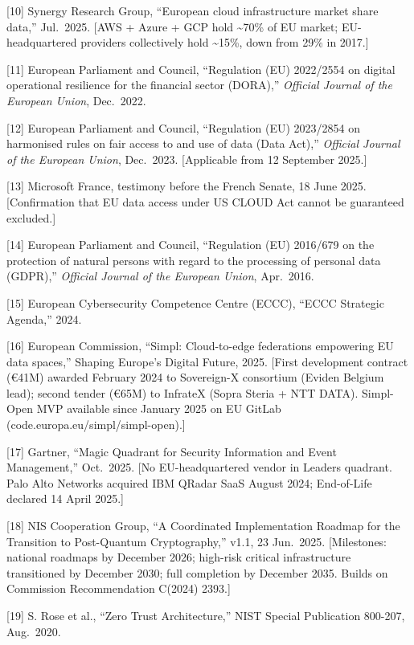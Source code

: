 \documentclass{ieeeaccess}
\begin{document}
{[}10{]} Synergy Research Group, ``European cloud infrastructure market
share data,'' Jul.~2025. {[}AWS + Azure + GCP hold \textasciitilde70\%
of EU market; EU-headquartered providers collectively hold
\textasciitilde15\%, down from 29\% in 2017.{]}

{[}11{]} European Parliament and Council, ``Regulation (EU) 2022/2554 on
digital operational resilience for the financial sector (DORA),''
\emph{Official Journal of the European Union}, Dec.~2022.

{[}12{]} European Parliament and Council, ``Regulation (EU) 2023/2854 on
harmonised rules on fair access to and use of data (Data Act),''
\emph{Official Journal of the European Union}, Dec.~2023. {[}Applicable
from 12 September 2025.{]}

{[}13{]} Microsoft France, testimony before the French Senate, 18 June
2025. {[}Confirmation that EU data access under US CLOUD Act cannot be
guaranteed excluded.{]}

{[}14{]} European Parliament and Council, ``Regulation (EU) 2016/679 on
the protection of natural persons with regard to the processing of
personal data (GDPR),'' \emph{Official Journal of the European Union},
Apr.~2016.

{[}15{]} European Cybersecurity Competence Centre (ECCC), ``ECCC
Strategic Agenda,'' 2024.

{[}16{]} European Commission, ``Simpl: Cloud-to-edge federations
empowering EU data spaces,'' Shaping Europe's Digital Future, 2025.
{[}First development contract (€41M) awarded February 2024 to
Sovereign-X consortium (Eviden Belgium lead); second tender (€65M) to
InfrateX (Sopra Steria + NTT DATA). Simpl-Open MVP available since
January 2025 on EU GitLab (code.europa.eu/simpl/simpl-open).{]}

{[}17{]} Gartner, ``Magic Quadrant for Security Information and Event
Management,'' Oct.~2025. {[}No EU-headquartered vendor in Leaders
quadrant. Palo Alto Networks acquired IBM QRadar SaaS August 2024;
End-of-Life declared 14 April 2025.{]}

{[}18{]} NIS Cooperation Group, ``A Coordinated Implementation Roadmap
for the Transition to Post-Quantum Cryptography,'' v1.1, 23 Jun.~2025.
{[}Milestones: national roadmaps by December 2026; high-risk critical
infrastructure transitioned by December 2030; full completion by
December 2035. Builds on Commission Recommendation C(2024) 2393.{]}

{[}19{]} S. Rose et al., ``Zero Trust Architecture,'' NIST Special
Publication 800-207, Aug.~2020.
\end{document}
